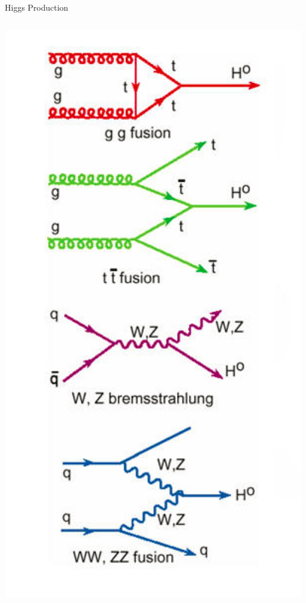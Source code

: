\begin{frame}{Higgs Production}
\begin{center}
\begin{columns}
  \begin{column}{0.35\textwidth}
    \includegraphics[width=0.99\textwidth]{images/higgs_production_feynman.png}
  \end{column}

\end{columns}
\end{center}
\end{frame}
